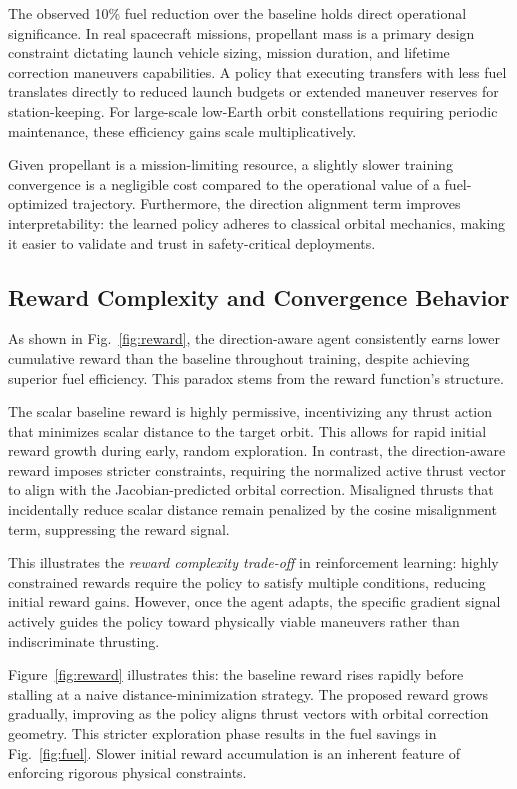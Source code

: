 \documentclass[paper]{ieice}
\begin{document}
The observed 10\% fuel reduction over the baseline holds direct operational significance. In real spacecraft missions, propellant mass is a primary design constraint dictating launch vehicle sizing, mission duration, and lifetime correction maneuvers capabilities. A policy that executing transfers with less fuel translates directly to reduced launch budgets or extended maneuver reserves for station-keeping. For large-scale low-Earth orbit constellations requiring periodic maintenance, these efficiency gains scale multiplicatively.

Given propellant is a mission-limiting resource, a slightly slower training convergence is a negligible cost compared to the operational value of a fuel-optimized trajectory. Furthermore, the direction alignment term improves interpretability: the learned policy adheres to classical orbital mechanics, making it easier to validate and trust in safety-critical deployments.

\subsection{Reward Complexity and Convergence Behavior}

As shown in Fig.~\ref{fig:reward}, the direction-aware agent consistently earns lower cumulative reward than the baseline throughout training, despite achieving superior fuel efficiency. This paradox stems from the reward function's structure.

The scalar baseline reward is highly permissive, incentivizing any thrust action that minimizes scalar distance to the target orbit. This allows for rapid initial reward growth during early, random exploration. In contrast, the direction-aware reward imposes stricter constraints, requiring the normalized active thrust vector to align with the Jacobian-predicted orbital correction. Misaligned thrusts that incidentally reduce scalar distance remain penalized by the cosine misalignment term, suppressing the reward signal.

This illustrates the \textit{reward complexity trade-off} in reinforcement learning: highly constrained rewards require the policy to satisfy multiple conditions, reducing initial reward gains. However, once the agent adapts, the specific gradient signal actively guides the policy toward physically viable maneuvers rather than indiscriminate thrusting.

Figure~\ref{fig:reward} illustrates this: the baseline reward rises rapidly before stalling at a naive distance-minimization strategy. The proposed reward grows gradually, improving as the policy aligns thrust vectors with orbital correction geometry. This stricter exploration phase results in the fuel savings in Fig.~\ref{fig:fuel}. Slower initial reward accumulation is an inherent feature of enforcing rigorous physical constraints.
\end{document}
